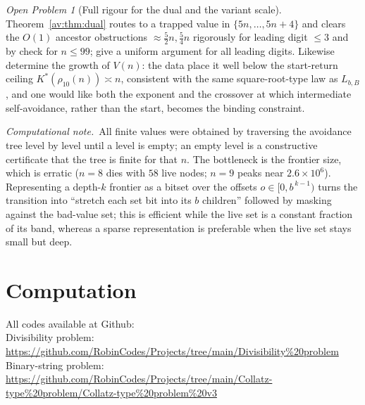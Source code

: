 \documentclass[a4paper]{article}
\theoremstyle{plain}
\theoremstyle{definition}
\theoremstyle{remark}
\newtheorem{openproblem}{Open Problem}[subsection]
\newcommand{\Lbb}[1][b,B]{L_{#1}}
\begin{document}
\begin{openproblem}[Full rigour for the dual and the variant scale]
Theorem~\ref{av:thm:dual} routes to a trapped value in $\{5n,\dots,5n+4\}$ and clears the $O(1)$ ancestor obstructions $\approx\tfrac52n,\tfrac54n$ rigorously for leading digit $\le3$ and by check for $n\le99$; give a uniform argument for all leading digits. Likewise determine the growth of $V(n)$: the data place it well below the start-return ceiling $K^{*}(\rho_{10}(n))\asymp n$, consistent with the same square-root-type law as $\Lbb$, and one would like both the exponent and the crossover at which intermediate self-avoidance, rather than the start, becomes the binding constraint.
\end{openproblem}

\bigskip
\noindent\textit{Computational note.}\ All finite values were obtained by traversing the avoidance tree level by level until a level is empty; an empty level is a constructive certificate that the tree is finite for that $n$. The bottleneck is the frontier size, which is erratic ($n=8$ dies with $58$ live nodes; $n=9$ peaks near $2.6\times10^{6}$). Representing a depth-$k$ frontier as a bitset over the offsets $o\in[0,b^{\,k-1})$ turns the transition into ``stretch each set bit into its $b$ children'' followed by masking against the bad-value set; this is efficient while the live set is a constant fraction of its band, whereas a sparse representation is preferable when the live set stays small but deep.


\appendix
\section{Computation}
All codes available at Github:\\

Divisibility problem: \url{https://github.com/RobinCodes/Projects/tree/main/Divisibility%20problem}\\

Binary-string problem: \url{https://github.com/RobinCodes/Projects/tree/main/Collatz-type%20problem/Collatz-type%20problem%20v3}\\
\end{document}
